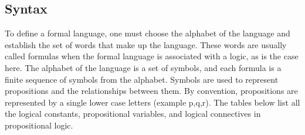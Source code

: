 \subsection{Syntax}
\label{chap:prop-syntax}
To define a formal language, one must choose the alphabet of the language and establish the set of words that make up the language. These words are usually called formulas when the formal language is associated with a logic, as is the case here. The alphabet of the language is a set of symbols, and each formula is a finite sequence of symbols from the alphabet.
Symbols are used to represent propositions and the relationships between them. By convention, propositions are represented by a single lower case letters (example p,q,r). The tables below list all the logical constants, propositional variables, and logical connectives in propositional logic.  

\begin{table}[h!]
    \centering
    \caption{Logical Constants and Propositional Variables}
\end{table}

\begin{table}[h!]
    \centering
    \caption{Logical Connectives}
\end{table}

